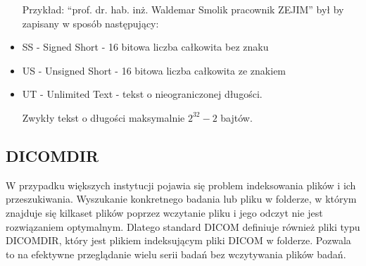 \begin{itemize}
          Przykład: \enquote{prof. dr. hab. inż. Waldemar Smolik pracownik ZEJIM} był by zapisany w sposób następujący: 

    \item SS - Signed Short - 16 bitowa liczba całkowita bez znaku

    \item US - Unsigned Short - 16 bitowa liczba całkowita ze znakiem

    \item UT - Unlimited Text - tekst o nieograniczonej długości.

          Zwykły tekst o długości maksymalnie $2^{32}-2$ bajtów.
\end{itemize}

\subsection{DICOMDIR}

W przypadku większych instytucji pojawia się problem indeksowania plików i ich przeszukiwania.
Wyszukanie konkretnego badania lub pliku w folderze, w którym znajduje się kilkaset plików poprzez wczytanie pliku i jego odczyt nie jest rozwiązaniem optymalnym.
Dlatego standard DICOM definiuje również pliki typu DICOMDIR, który jest plikiem indeksującym pliki DICOM w folderze.
Pozwala to na efektywne przeglądanie wielu serii badań bez wczytywania plików badań.
